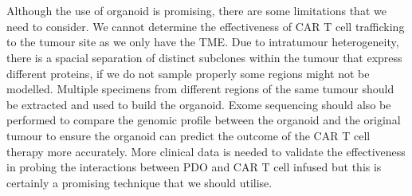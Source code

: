 \documentclass[12pt,oneside]{report}
\begin{document}
\\\\Although the use of organoid is promising, there are some limitations that we need to consider. We cannot determine the effectiveness of CAR T cell trafficking to the tumour site as we only have the TME. Due to intratumour heterogeneity, there is a spacial separation of distinct subclones within the tumour that express different proteins\citep{heterogeneity}, if we do not sample properly some regions might not be modelled. Multiple specimens from different regions of the same tumour should be extracted and used to build the organoid. Exome sequencing should also be performed to compare the genomic profile between the organoid and the original tumour to ensure the organoid can predict the outcome of the CAR T cell therapy more accurately. More clinical data is needed to validate the effectiveness in probing the interactions between PDO and CAR T cell infused but this is certainly a promising technique that we should utilise. 
\end{document}

